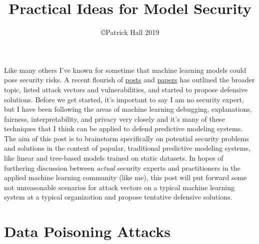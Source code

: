 \documentclass[fleqn]{article}
\title{Practical Ideas for Model Security}%
\author{\copyright Patrick Hall 2019}
\begin{document}
\maketitle

Like many others I've known for sometime that machine learning models could pose security risks. A recent flourish of \href{https://www.oreilly.com/ideas/you-created-a-machine-learning-application-now-make-sure-its-secure}{posts} and \href{https://arxiv.org/pdf/1811.01134.pdf}{papers} has outlined the broader topic, listed attack vectors and vulnerabilities, and started to propose defensive solutions. Before we get started, it's important to say I am no security expert, but I have been following the areas of machine learning debugging, explanations, fairness, interpretability, and privacy very closely and it's many of these techniques that I think can be applied to defend predictive modeling systems. The aim of this post is to brainstorm specifically on potential security problems and solutions in the context of popular, traditional predictive modeling systems, like linear and tree-based models trained on static datasets. In hopes of furthering discussion between \textit{actual} security experts and practitioners in the applied machine learning community (like me), this post will put forward some not unreasonable scenarios for attack vectors on a typical machine learning system at a typical organization and propose tentative defensive solutions. 

\section{Data Poisoning Attacks} \label{sec:data_poisoning}
\end{document}
